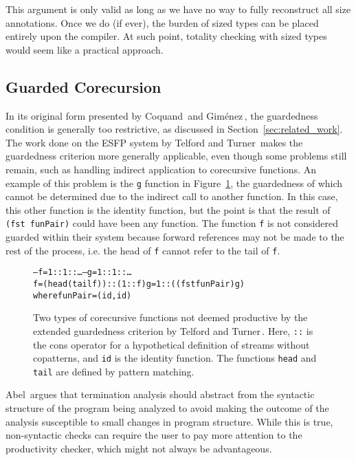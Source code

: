 This argument is only valid as long as we have no way to fully reconstruct all size annotations. Once we do (if ever), the burden of sized types can be placed entirely upon the compiler. At such point, totality checking with sized types would seem like a practical approach.

\subsection{Guarded Corecursion}
\label{sec:guarded_cored}
In its original form presented by Coquand\,\citep{Coquand94} and Gim\'{e}nez\,\citep{Gimenez95}, the guardedness condition is generally too restrictive, as discussed in Section~\ref{sec:related_work}. The work done on the ESFP system by Telford and Turner\,\citep{Telford97ensuringstreams,Telford98ensuringthe} makes the guardedness criterion more generally applicable, even though some problems still remain, such as handling indirect application to corecursive functions. An example of this problem is the \texttt{g} function in Figure~\ref{fig:TelfordTurnerProblems}, the guardedness of which cannot be determined due to the indirect call to another function. In this case, this other function is the identity function, but the point is that the result of \texttt{(fst~funPair)} could have been any function. The function \texttt{f} is not considered guarded within their system because forward references may not be made to the rest of the process, i.e. the head of \texttt{f} cannot refer to the tail of \texttt{f}.

\begin{figure}
\begin{alltt}
-- f = 1 :: 1 :: \ldots                            -- g = 1 :: 1 :: \ldots
f = (head (tail f)) :: (1 :: f)                 g = 1 :: ((fst funPair) g)
                                                where funPair = (id, id)
\end{alltt}
\caption{Two types of corecursive functions not deemed productive by the extended guardedness criterion by Telford and Turner\,\citep[Section~6.3]{Telford98ensuringthe}. Here, \texttt{::} is the cons operator for a hypothetical definition of streams without copatterns, and \texttt{id} is the identity function. The functions \texttt{head} and \texttt{tail} are defined by pattern matching.} 
\label{fig:TelfordTurnerProblems}
\end{figure}

Abel\,\citep{Abel99terminationchecking} argues that termination analysis should abstract from the syntactic structure of the program being analyzed to avoid making the outcome of the analysis susceptible to small changes in program structure. While this is true, non-syntactic checks can require the user to pay more attention to the productivity checker, which might not always be advantageous. 

